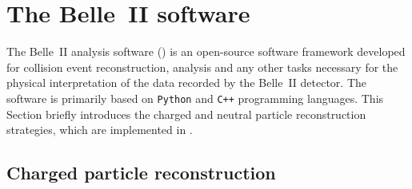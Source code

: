 \section{The Belle~II software}\label{sec:belle2_software}

The Belle~II analysis software (\basftwo) \cite{Kuhr:2018lps} is an open-source software framework developed for collision event reconstruction, analysis 
and any other tasks necessary for the physical interpretation of the data recorded by the Belle~II detector.
The software is primarily based on \texttt{Python} and \texttt{C++} programming languages.
This Section briefly introduces the charged and neutral particle reconstruction strategies, which are implemented in \basftwo.

\subsection{Charged particle reconstruction}\label{sec:tracking}

